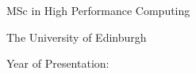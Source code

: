 \documentclass[12pt,a4paper]{report}
\begin{document}
%
%



%
%

\makeEPCCtitle

\thispagestyle{empty}

\vspace{12cm}

\begin{center}

\large{MSc in High Performance Computing}

\large{The University of Edinburgh}

\large{Year of Presentation: \the\year}

\end{center}

\newpage

%
%
\thispagestyle{empty}
\clearpage\mbox{}\clearpage


%
%
\end{document}

